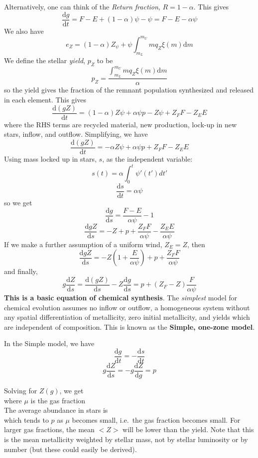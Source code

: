 \documentclass{article}
\begin{document}
Alternatively, one can think of the \textit{Return fraction},
$R=1-\alpha$. This gives
\[
    \frac{\mathrm{d}g}{\mathrm{d}t} = F-E+(1-\alpha)\psi-\psi=F-E-\alpha\psi
    \]
We also have
\[
    e_{Z} = (1-\alpha)Z_{\psi} + \psi \int_{m_{L}}^{m_{U}}{
        mq_{Z}\xi(m)\mathrm{d}m}
    \]
We define the stellar \textit{yield}, $p_{Z}$ to be
\[
    p_{Z} = \frac{\int_{m_{L}}^{m_{U}} {mq_{Z}\xi(m) \mathrm{d}m}} {\alpha}
    \]
so the yield gives the fraction of the remnant population synthesized
and released in each element. This gives
\[
    \frac{\mathrm{d}(gZ)}{\mathrm{d}t} =
    (1-\alpha)Z\psi + \alpha\psi{p} -Z\psi + Z_{F}F - Z_{E}E
    \]
where the RHS terms are recycled material, new production, lock-up in
new stars, inflow, and outflow. Simplifying, we have
\[
    \frac{\mathrm{d}(gZ)}{\mathrm{d}t} =
    -\alpha{Z}\psi + \alpha\psi{p} + Z_{F}F - Z_{E}E
    \]
Using mass locked up in stars, $s$, as the independent variable:
\[
    s(t) = \alpha\int_{0}^{t} {\psi'(t')dt'}
    \]
\[
    \frac{\mathrm{d}s}{\mathrm{d}t} = \alpha\psi
    \]
so we get
\[
    \frac{\mathrm{d}g}{\mathrm{d}s} = \frac{F-E}{\alpha\psi} - 1
    \]
\[
    \frac{\mathrm{d}gZ}{\mathrm{d}s} = -Z + p +
    \frac{Z_{F}F}{\alpha\psi} -
    \frac{Z_{E}E}{\alpha\psi}
    \]
If we make a further assumption of a uniform wind, $Z_{E}=Z$, then
\[
    \frac{\mathrm{d}gZ}{\mathrm{d}s} = -Z\left( 1 + \frac{E}{\alpha\psi}\right) +
    p + \frac{Z_{F}F}{\alpha\psi}
    \]
and finally,
\[
    g\frac{\mathrm{d}Z}{\mathrm{d}s} =
    \frac{\mathrm{d}(gZ)}{\mathrm{d}s} - Z\frac{\mathrm{d}g}{\mathrm{d}s} =
    p + (Z_{F} - Z)\frac{F}{\alpha\psi}
    \]
\textbf{This is a basic equation of chemical synthesis}.
The \emph{simplest} model for chemical evolution assumes no
inflow or outflow, a homogeneous system without any spatial
differentiation of metallicity, zero initial metallicity, and
yields which are independent of composition. This is known as the
\textcolor{bred}{\textbf{Simple, one-zone model}}.

In the Simple model, we have
\[
    \frac{\mathrm{d}g}{\mathrm{d}t} = -\frac{\mathrm{d}s}{\mathrm{d}t}
    \]
\[
    g\frac{\mathrm{d}Z}{\mathrm{d}s} = -g\frac{\mathrm{d}Z}{\mathrm{d}g} = p
    \]

Solving for $Z(g)$, we get
\[
    \]
where $\mu$ is the gas fraction
\[
    \]
The average abundance in stars is
\[
    \]
which tends to $p$ as $\mu$ becomes small, i.e.\ the gas fraction becomes
small. For larger gas fractions, the mean $<Z>$ will be lower than the yield.
Note that this is the mean metallicity weighted by stellar mass, not by
stellar luminosity or by number (but these could easily be derived).
\end{document}
